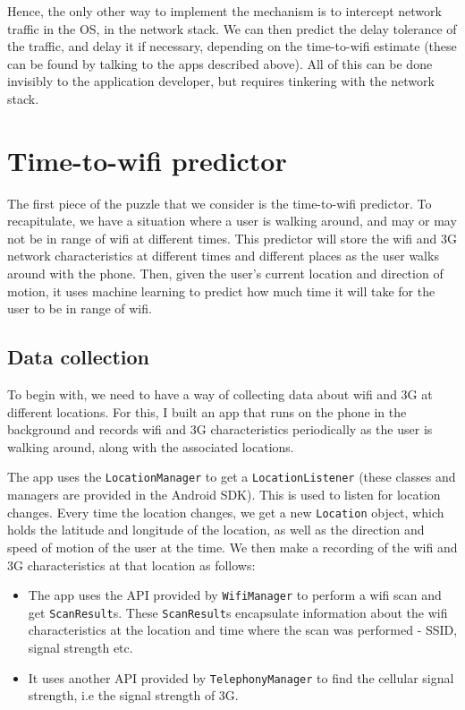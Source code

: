 \documentclass[12pt, fleqn]{article}
\begin{document}
\begin{itemize}
  Hence, the only other way to implement the mechanism is to intercept network 
  traffic in the OS, in the network stack. We can then predict the delay 
  tolerance of the traffic, and delay it if necessary, depending on the 
  time-to-wifi estimate (these can be found by talking to the apps described above). 
  All of this can be done invisibly to the application 
  developer, but requires tinkering with the network stack. 
\end{itemize}



\section{Time-to-wifi predictor}


The first piece of the puzzle that we consider is the time-to-wifi predictor. To 
recapitulate, we have a situation where a user is walking around, and may or may
not be in range of wifi at different times. This predictor will store the wifi and 3G network characteristics 
at different times and different places as the user walks around with the 
phone. Then, given the user's current location and direction of motion, 
it uses machine learning to predict how much time it will take for the user to 
be in range of wifi. 

\subsection{Data collection}
\label{time-to-wifi-data-collection}

To begin with, we need to have a way of collecting data about wifi and 3G at 
different locations. For this, I built an app that runs on the phone in the background and records 
wifi and 3G characteristics periodically as the user is walking around, along with 
the associated locations.

The app uses the \texttt{LocationManager} to get a \texttt{LocationListener} 
(these classes and managers are provided in the Android SDK).
This is used to listen for location changes. Every time the location changes, we 
get a new \texttt{Location} object, which holds the latitude and longitude of the location,
as well as the direction and speed of motion of the user at the time. We then
make a recording of the wifi and 3G characteristics at that location as follows:
\begin{itemize}
  \item The app uses the API provided by \texttt{WifiManager} to 
perform a wifi scan and get \texttt{ScanResult}s. These \texttt{ScanResult}s encapsulate information 
about the wifi characteristics at the location and time where the scan was 
performed - SSID, signal strength etc. 
  
  \item It uses another API provided by \texttt{TelephonyManager} to find the 
cellular signal strength, i.e the signal strength of 3G. 
\end{itemize}
\end{document}
